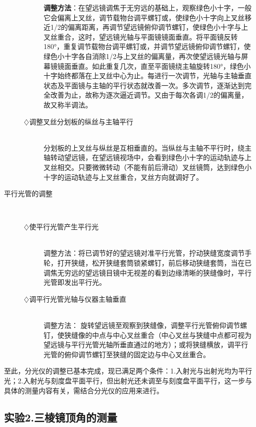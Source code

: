 \documentclass[11pt,a4paper,oneside]{article}
\begin{document}
\begin{description}
\begin{description}
	\textbf{调整方法}：在望远镜调焦于无穷远的基础上，观察绿色小十字，一般它会偏离上叉丝，调节载物台调平螺钉或，使绿色小十字向上叉丝移近1/2的偏离距离，再调节望远镜俯仰调节螺钉，使绿色小十字与上叉丝重合，这时，望远镜光轴与平面镜镜面垂直。将平面镜反转180°，重复调节载物台调平螺钉或，并调节望远镜俯仰调节螺钉，使绿色小十字各自消除1/2与上叉丝的偏离量，再次使望远镜光轴与屏幕镜镜面垂直。如此重复几次，直至平面镜绕主轴旋转180°，绿色小十字始终都落在上叉丝中心为止。每进行一次调节，光轴与主轴垂直状态及平面镜与主轴的平行状态就改善一次。多次调节，逐渐达到完全改善为止，故称为逐次逼近调节。又由于每次各调1/2的偏离量，故又称半调法。
	\item[$\diamondsuit$调整叉丝分划板的纵丝与主轴平行]\hspace*{\fill}\\
	分划板的上叉丝与纵丝是互相垂直的。当纵丝与主轴不平行时，绕主轴转动望远镜，在望远镜视场中，会看到绿色小十字的运动轨迹与上叉丝相交。只要微微转动（不能有前后滑动）叉丝镜筒，达到绿色小十字的运动轨迹与上叉丝重合，叉丝方向就调好了。
	\end{description}
\item[平行光管的调整]\hspace*{\fill}\\
  \begin{description}
    \item[$\diamondsuit$使平行光管产生平行光]\hspace*{\fill}\\ 调整方法：将已调节好的望远镜对准平行光管，拧动狭缝宽度调节手轮，打开狭缝，松开狭缝套筒锁紧螺钉，前后移动狭缝套筒，当在已调焦无穷远的望远镜目镜中无视差的看到边缘清晰的狭缝像时，平行光管即发出平行光。
    \item[$\diamondsuit$调平行光管光轴与仪器主轴垂直]\hspace*{\fill}\\ 调整方法： 旋转望远镜至观察到狭缝像，调整平行光管俯仰调节螺钉，使狭缝像的中点与中心叉丝重合（中心叉丝与狭缝中点都可视为望远镜与平行光管光轴所垂直通过的地方）；或将狭缝横放，调平行光管的俯仰调节螺钉至狭缝的固定边与中心叉丝重合。
  \end{description}
\end{description}

至此，分光仪的调整已基本完成，现已满足两个条件：1.入射光与出射光均为平行光；2.入射光与刻度盘平面平行，但出射光还未调至与刻度盘平面平行，这一步与具体的测量内容有关，需结合分光仪的应用来进行。
\subsection*{实验2.三棱镜顶角的测量}
\end{document}
